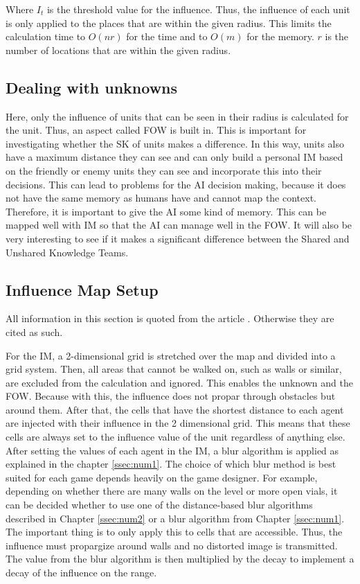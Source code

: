 \documentclass[]{report}
\begin{document}
	Where $I_t$ is the threshold value for the influence. Thus, the influence of each unit is only applied to the places that are within the given radius. This limits the calculation time to $O(nr)$ for the time and to $O(m)$ for the memory. $r$ is the number of locations that are within the given radius.
	
	\subsection{Dealing with unknowns} \label{ssec:dwu}
	Here, only the influence of units that can be seen in their radius is calculated for the unit. Thus, an aspect called \ac{FOW} is built in. This is important for investigating whether the \ac{SK} of units makes a difference. In this way, units also have a maximum distance they can see and can only build a personal \ac{IM} based on the friendly or enemy units they can see and incorporate this into their decisions. This can lead to problems for the \ac{AI} decision making, because it does not have the same memory as humans have and cannot map the context. Therefore, it is important to give the \ac{AI} some kind of memory. This can be mapped well with IM so that the \ac{AI} can manage well in the \ac{FOW}. It will also be very interesting to see if it makes a significant difference between the Shared and Unshared Knowledge Teams.
	
	\subsection{Influence Map Setup}
	All information in this section is quoted from the article \citep{gameDevInfluenceMap}. Otherwise they are cited as such.
	
	For the \ac{IM}, a 2-dimensional grid is stretched over the map and divided into a grid system. Then, all areas that cannot be walked on, such as walls or similar, are excluded from the calculation and ignored. This enables the unknown and the FOW. Because with this, the influence does not propar through obstacles but around them. After that, the cells that have the shortest distance to each agent are injected with their influence in the 2 dimensional grid. This means that these cells are always set to the influence value of the unit regardless of anything else. After setting the values of each agent in the IM, a blur algorithm is applied as explained in the chapter \ref{ssec:num1}. The choice of which blur method is best suited for each game depends heavily on the game designer. For example, depending on whether there are many walls on the level or more open vials, it can be decided whether to use one of the distance-based blur algorithms described in Chapter \ref{ssec:num2} or a blur algorithm from Chapter \ref{ssec:num1}. The important thing is to only apply this to cells that are accessible. Thus, the influence must propargize around walls and no distorted image is transmitted. The value from the blur algorithm is then multiplied by the decay to implement a decay of the influence on the range. 
	
\end{document}
